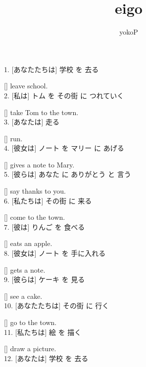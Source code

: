 \documentclass[uplatex,
paper=a4,
fontsize=18pt,
jafontsize=16pt,
number_of_lines=30,
line_length=30zh,
baselineskip=25pt,
]{jlreq}
\author{yokoP}
\title{eigo}
\begin{document}
1.  [あなたたちは] 学校 を 去る

  [\hspace{3em}] leave school.
\\

2.  [私は] トム を その街 に つれていく

  [\hspace{3em}] take Tom to the town.
\\

3.  [あなたは] 走る

  [\hspace{3em}] run.
\\

4.  [彼女は] ノート を マリー に あげる

  [\hspace{3em}] gives a note to Mary.
\\

5.  [彼らは] あなた に ありがとう と 言う

  [\hspace{3em}] say thanks to you.
\\

6.  [私たちは] その街 に 来る

  [\hspace{3em}] come to the town.
\\

7.  [彼は] りんご を 食べる

  [\hspace{3em}] eats an apple.
\\

8.  [彼女は] ノート を 手に入れる

  [\hspace{3em}] gets a note.
\\

9.  [彼らは] ケーキ を 見る

  [\hspace{3em}] see a cake.
\\

10.  [あなたたちは] その街 に 行く

  [\hspace{3em}] go to the town.
\\

11.  [私たちは] 絵 を 描く

  [\hspace{3em}] draw a picture.
\\

12.  [あなたは] 学校 を 去る
\end{document}
